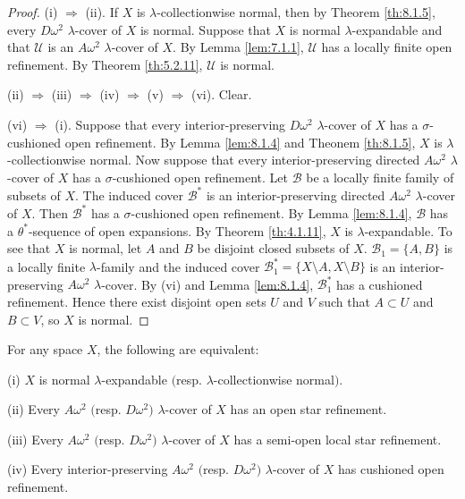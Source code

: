 \documentclass[main.tex]{subfiles}
\begin{document}
\begin{proof} 
(i) $\Rightarrow$ (ii).  If $X$ is $\lambda$-collectionwise normal, then by 
Theorem \ref{th:8.1.5}, every  $D\omega^2$ $\lambda$-cover of $X$ is normal. 
Suppose  that $X$ is normal  $\lambda$-expandable and that $\mathscr{U}$ 
is an $A\omega^2$ 
$\lambda$-cover of $X$. By Lemma \ref{lem:7.1.1},  $\mathscr{U}$  has a locally finite
 open refinement. By Theorem \ref{th:5.2.11}, $\mathscr{U}$ is normal. 

(ii) $\Rightarrow$ (iii) $\Rightarrow$  (iv) $\Rightarrow$ (v) $\Rightarrow$ (vi). Clear. 

(vi) $\Rightarrow$ (i). Suppose that every interior-preserving  
$D\omega^2$ $\lambda$-cover of $X$ has 
a $\sigma$-cushioned open refinement. By Lemma \ref{lem:8.1.4} and
Theonem \ref{th:8.1.5}, $X$ is $\lambda$-collectionwise normal. 
Now suppose that every interior-preserving directed $A\omega^2$ 
$\lambda$-cover of  $X$ has 
a  $\sigma$-cushioned open refinement. Let $\mathscr{B}$ be 
a locally finite family 
of subsets of $X$. The induced cover  $\mathscr{B}^*$ is an 
interior-preserving  directed $A\omega^2$  $\lambda$-cover of $X$. 
Then  $\mathscr{B}^*$ has a $\sigma$-cushioned  open refinement. 
By Lemma \ref{lem:8.1.4}, $\mathscr{B}$ has a $\theta^*$-sequence 
of open expansions. By Theorem \ref{th:4.1.11},  $X$ is $\lambda$-expandable.
To see that  $X$ is normal, let $A$ and $B$ be disjoint 
closed subsets of $X$. $\mathscr{B}_1 = \{A, B\}$ is a locally finite $\lambda$-family 
and  the induced 
cover $\mathscr{B}_1^* = \{X\setminus A, X\setminus B\}$ is an interior-preserving 
$A\omega^2$ $\lambda$-cover. 
By (vi) and Lemma \ref{lem:8.1.4}, $\mathscr{B}_1^*$ has a  cushioned
refinement. Hence there exist disjoint open sets $U$ and $V$
such that $A\subset U$ and $B\subset V$, so $X$ is normal.
\end{proof}

{\theorem{} \label{th:8.1.8}
For any  space $X$, the following are equivalent:

\textup{(i)}  $X$ is normal $\lambda$-expandable $($resp. $\lambda$-collectionwise normal$)$.

\textup{(ii)}    Every $A\omega^2$ $($resp. $D\omega^2)$  $\lambda$-cover 
of $X$ has an open star refinement. 

\textup{(iii)}    Every $A\omega^2$ $($resp. $D\omega^2)$  $\lambda$-cover 
of $X$ has a semi-open local star refinement. 

\textup{(iv)}    Every interior-preserving $A\omega^2$ $($resp. $D\omega^2)$  $\lambda$-cover 
of $X$ has cushioned open refinement.
}
\end{document}
